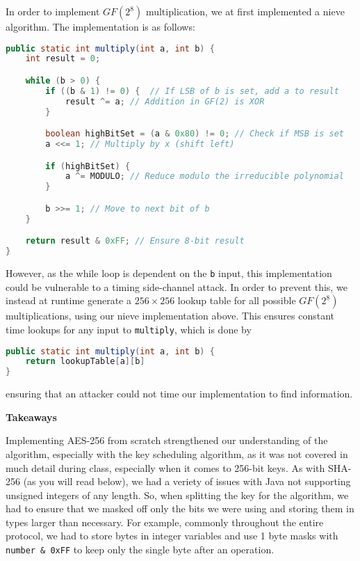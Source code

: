 In order to implement $GF(2^8)$ multiplication, we at first implemented a nieve algorithm. The implementation is as follows:
\begin{lstlisting}[language=Java]
public static int multiply(int a, int b) {
    int result = 0;

    while (b > 0) {
        if ((b & 1) != 0) {  // If LSB of b is set, add a to result
            result ^= a; // Addition in GF(2) is XOR
        }

        boolean highBitSet = (a & 0x80) != 0; // Check if MSB is set
        a <<= 1; // Multiply by x (shift left)

        if (highBitSet) {
            a ^= MODULO; // Reduce modulo the irreducible polynomial
        }

        b >>= 1; // Move to next bit of b
    }

    return result & 0xFF; // Ensure 8-bit result
}
\end{lstlisting}
However, as the while loop is dependent on the \texttt{b} input, this implementation could 
be vulnerable to a timing side-channel attack. In order to prevent this, we instead at runtime generate 
a $256\times 256$ lookup table for all possible $GF(2^8)$ multiplications, using our nieve implementation above.
This ensures constant time lookups for any input to \texttt{multiply}, which is done by 
\begin{lstlisting}[language=Java]
public static int multiply(int a, int b) {
    return lookupTable[a][b]
}
\end{lstlisting}
ensuring that an attacker could not time our implementation to find information. 

\textbf{Takeaways}

Implementing AES-256 from scratch strengthened our understanding of the algorithm, especially with the 
key scheduling algorithm, as it was not covered in much detail during class, especially when it comes to 256-bit keys.
As with SHA-256 (as you will read below), we had a veriety of issues with Java not supporting unsigned integers of any length.
So, when splitting the key for the algorithm, we had to ensure that we masked off only the bits we were using and storing them in 
types larger than necessary. For example, commonly throughout the entire protocol, we had to store bytes in integer variables and use 
1 byte masks with \texttt{number \& 0xFF} to keep only the single byte after an operation.
